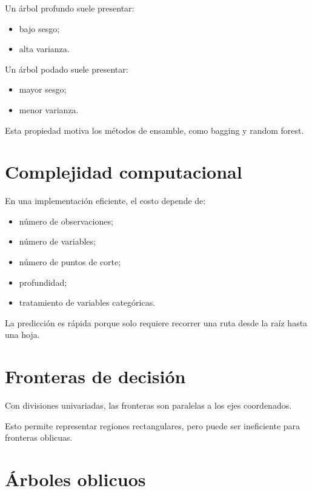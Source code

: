 \documentclass[
  spanish,
  11pt,
  letterpaper,
  DIV=11,
  numbers=noendperiod]{scrreprt}
\providecommand{\tightlist}{%
  \setlength{\itemsep}{0pt}\setlength{\parskip}{0pt}}
\theoremstyle{definition}
\theoremstyle{plain}
\theoremstyle{definition}
\theoremstyle{remark}
\begin{document}
Un árbol profundo suele presentar:

\begin{itemize}
\tightlist
\item
  bajo sesgo;
\item
  alta varianza.
\end{itemize}

Un árbol podado suele presentar:

\begin{itemize}
\tightlist
\item
  mayor sesgo;
\item
  menor varianza.
\end{itemize}

Esta propiedad motiva los métodos de ensamble, como bagging y random
forest.

\section{Complejidad computacional}\label{complejidad-computacional}

En una implementación eficiente, el costo depende de:

\begin{itemize}
\tightlist
\item
  número de observaciones;
\item
  número de variables;
\item
  número de puntos de corte;
\item
  profundidad;
\item
  tratamiento de variables categóricas.
\end{itemize}

La predicción es rápida porque solo requiere recorrer una ruta desde la
raíz hasta una hoja.

\section{Fronteras de decisión}\label{fronteras-de-decisiuxf3n-1}

Con divisiones univariadas, las fronteras son paralelas a los ejes
coordenados.

Esto permite representar regiones rectangulares, pero puede ser
ineficiente para fronteras oblicuas.

\section{Árboles oblicuos}\label{uxe1rboles-oblicuos}
\end{document}

